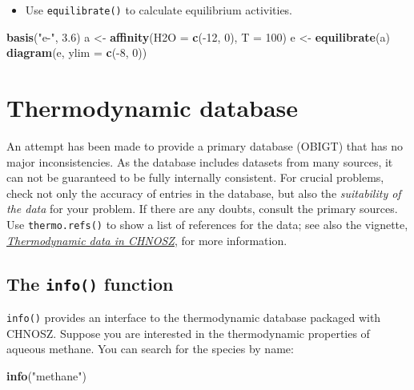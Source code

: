 \documentclass[]{tufte-handout}
\newenvironment{Shaded}{}{}
\newcommand{\KeywordTok}[1]{\textcolor[rgb]{0.00,0.44,0.13}{\textbf{#1}}}
\newcommand{\DataTypeTok}[1]{\textcolor[rgb]{0.56,0.13,0.00}{#1}}
\newcommand{\DecValTok}[1]{\textcolor[rgb]{0.25,0.63,0.44}{#1}}
\newcommand{\FloatTok}[1]{\textcolor[rgb]{0.25,0.63,0.44}{#1}}
\newcommand{\StringTok}[1]{\textcolor[rgb]{0.25,0.44,0.63}{#1}}
\newcommand{\OperatorTok}[1]{\textcolor[rgb]{0.40,0.40,0.40}{#1}}
\newcommand{\NormalTok}[1]{#1}
\providecommand{\tightlist}{%
  \setlength{\itemsep}{0pt}\setlength{\parskip}{0pt}}
\begin{document}
\begin{itemize}
\tightlist
\item
  Use {\texttt{equilibrate()}} to calculate equilibrium activities.
\end{itemize}

\begin{Shaded}
\begin{Highlighting}[]
\KeywordTok{basis}\NormalTok{(}\StringTok{"e-"}\NormalTok{, }\FloatTok{3.6}\NormalTok{)}
\NormalTok{a <-}\StringTok{ }\KeywordTok{affinity}\NormalTok{(}\DataTypeTok{H2O =} \KeywordTok{c}\NormalTok{(}\OperatorTok{-}\DecValTok{12}\NormalTok{, }\DecValTok{0}\NormalTok{), }\DataTypeTok{T =} \DecValTok{100}\NormalTok{)}
\NormalTok{e <-}\StringTok{ }\KeywordTok{equilibrate}\NormalTok{(a)}
\KeywordTok{diagram}\NormalTok{(e, }\DataTypeTok{ylim =} \KeywordTok{c}\NormalTok{(}\OperatorTok{-}\DecValTok{8}\NormalTok{, }\DecValTok{0}\NormalTok{))}
\end{Highlighting}
\end{Shaded}

\section{Thermodynamic database}\label{thermodynamic-database}

An attempt has been made to provide a primary database (OBIGT) that has
no major inconsistencies. As the database includes datasets from many
sources, it can not be guaranteed to be fully internally consistent. For
crucial problems, check not only the accuracy of entries in the
database, but also the \emph{suitability of the data} for your problem.
If there are any doubts, consult the primary sources. Use
{\texttt{thermo.refs()}} to show a list of references for the data; see
also the vignette, \href{obigt.html}{{\emph{Thermodynamic data in
CHNOSZ}}}, for more information.

\subsection{\texorpdfstring{The {\texttt{info()}}
function}{The info() function}}\label{the-info-function}

{\texttt{info()}} provides an interface to the thermodynamic database
packaged with CHNOSZ. Suppose you are interested in the thermodynamic
properties of aqueous methane. You can search for the species by name:

\begin{Shaded}
\begin{Highlighting}[]
\KeywordTok{info}\NormalTok{(}\StringTok{"methane"}\NormalTok{)}
\end{Highlighting}
\end{Shaded}
\end{document}
